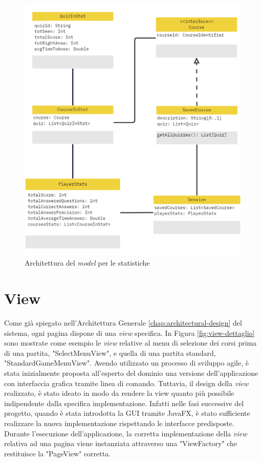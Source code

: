         \begin{figure}[H]
            \centering
            \includegraphics[scale=0.4]{Miro/statistics_model.png}
            \caption{Architettura del \textit{model} per le statistiche}
            \label{fig:model-statistics}
        \end{figure}
        
    \section{View}

    Come già spiegato nell'Architettura Generale \ref{chap:architectural-design} del sistema, ogni pagina dispone di una \textit{view} specifica. In Figura \ref{fig:view-dettaglio} sono mostrate come esempio le \textit{view} relative al menu di selezione dei corsi prima di una partita, "SelectMenuView", e quella di una partita standard, "StandardGameMenuView". Avendo utilizzato un processo di sviluppo agile, è stata inizialmente proposta all'esperto del dominio una versione dell'applicazione con interfaccia grafica tramite linea di comando. Tuttavia, il design della \textit{view} realizzato, è stato ideato in modo da rendere la view quanto più possibile indipendente dalla specifica implementazione. Infatti nelle fasi successive del progetto, quando è stata introdotta la GUI tramite JavaFX, è stato sufficiente realizzare la nuova implementazione rispettando le interfacce predisposte. Durante l'esecuzione dell'applicazione, la corretta implementazione della \textit{view} relativa ad una pagina viene instanziata attraverso una "ViewFactory" che restituisce la "PageView" corretta.
    
